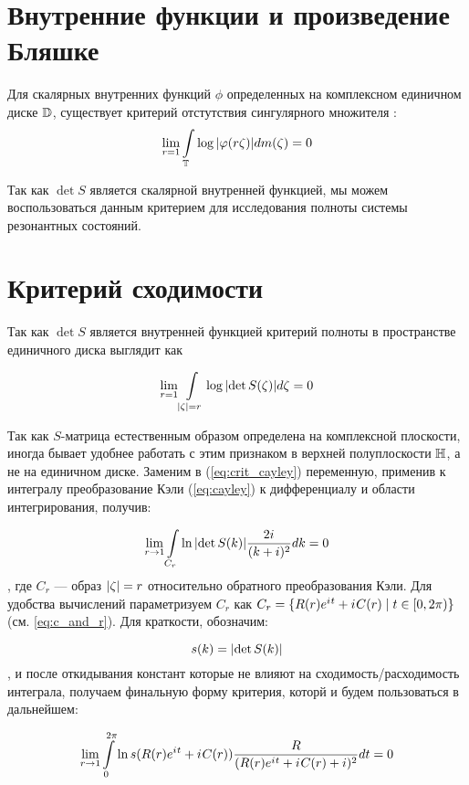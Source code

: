 \section{Внутренние функции и произведение Бляшке}
Для скалярных внутренних функций $\phi$ определенных на комплексном единичном диске $\mathbb{D}$, существует критерий отстутствия сингулярного множителя \cite[стр. 99]{nikol2012treatise}:
\[
\lim\limits_{r = 1} \int\limits_{\mathbb{T}} \log \abs{\varphi(r \zeta)} d m(\zeta) = 0
\]

Так как $\det S$ является скалярной внутренней функцией, мы можем воспользоваться данным критерием для исследования полноты системы резонантных состояний.


\section{Критерий сходимости}

Так как $\det S$ является внутренней функцией критерий полноты в пространстве единичного диска выглядит как

\begin{equation}\label{eq:crit_cayley}
\lim\limits_{r = 1} \int\limits_{\abs{\zeta} = r} \log \abs{\det S(\zeta)} d \zeta = 0
\end{equation}

Так как $S$-матрица естественным образом определена на комплексной плоскости, иногда бывает удобнее работать с этим признаком в верхней полуплоскости $\mathbb{H}$, а не на единичном диске. Заменим в (\ref{eq:crit_cayley}) переменную, применив к интегралу преобразование Кэли (\ref{eq:cayley}) к дифференциалу и области интегрирования, получив:

\begin{equation}\label{eq:crit}
\lim\limits_{r \to 1} \int\limits_{C_r} \ln \abs{\det S(k)} \frac{2 {i\mkern1mu}}{(k + i)^2} dk = 0
\end{equation}
, где $C_r$ — образ $\abs{\zeta} = r$ относительно обратного преобразования Кэли. Для удобства вычислений параметризуем $C_r$ как $C_r = \{R(r) e^{{i\mkern1mu} t} + {i\mkern1mu} C(r) \mid t \in [0, 2 \pi)\}$ (см. \ref{eq:c_and_r}). Для краткости, обозначим:

\[
s(k) = \abs{\det S(k)}
\]
, и после откидывания констант которые не влияют на сходимость/расходимость интеграла, получаем финальную форму критерия, которй и будем пользоваться в дальнейшем:

\begin{equation}\label{eq:critp}
\lim\limits_{r \to 1} \int\limits_{0}^{2 \pi} \ln s(R(r) e^{{i\mkern1mu} t} + {i\mkern1mu} C(r)) \frac{R}{(R(r) e^{{i\mkern1mu} t} + {i\mkern1mu} C(r) + i)^2} dt = 0
\end{equation}
